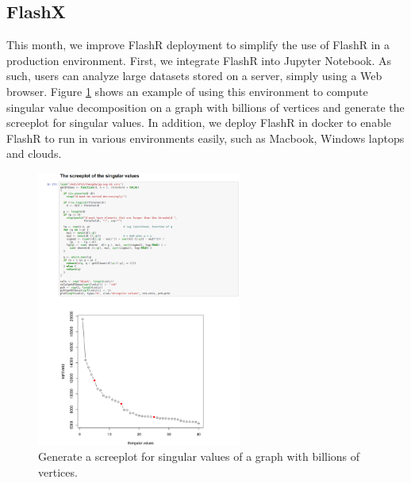 \documentclass[simplex.tex]{subfiles}
\begin{document}
\subsection{FlashX}

This month, we improve FlashR deployment to simplify the use of FlashR in
a production environment. First, we integrate FlashR into Jupyter Notebook.
As such, users can analyze large datasets stored on a server, simply using
a Web browser. Figure \ref{fig:FlashX2} shows an example of using this
environment to compute singular value decomposition on a graph with billions
of vertices and generate the screeplot for singular values. In addition,
we deploy FlashR in docker to enable FlashR to run in various environments
easily, such as Macbook, Windows laptops and clouds.

\begin{figure}[!h]
\begin{cframed}
\centering
\includegraphics[width=0.6\textwidth]{../../figs/PG-screeplot.png}
\caption{Generate a screeplot for singular values of a graph with billions
	of vertices.}
\label{fig:FlashX2}
\end{cframed}
\end{figure}
\end{document}
